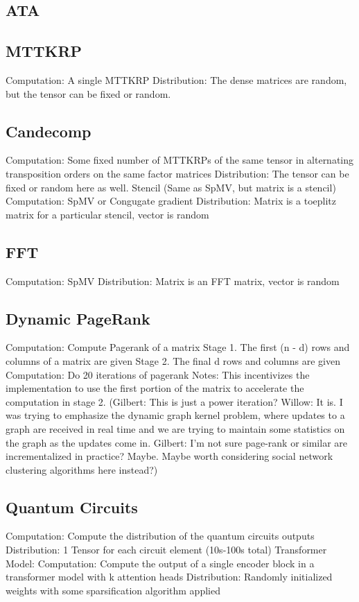 \documentclass{article}
\begin{document}
\subsection{ATA}

\subsection{MTTKRP}
	Computation: A single MTTKRP 
	Distribution: The dense matrices are random, but the tensor can be fixed or random.


\subsection{Candecomp}
	Computation: Some fixed number of MTTKRPs of the same tensor in alternating transposition orders on the same factor matrices
	Distribution: The tensor can be fixed or random here as well.
Stencil (Same as SpMV, but matrix is a stencil)
	Computation: SpMV or Congugate gradient
	Distribution: Matrix is a toeplitz matrix for a particular stencil, vector is random

\subsection{FFT}
	Computation: SpMV
	Distribution: Matrix is an FFT matrix, vector is random

\subsection{Dynamic PageRank}
	Computation: Compute Pagerank of a matrix
	Stage 1.
		The first (n - d) rows and columns of a matrix are given
	Stage 2.
		The final d rows and columns are given
	Computation:
		Do 20 iterations of pagerank
	Notes: This incentivizes the implementation to use the first portion of the matrix to accelerate the computation in stage 2.
(Gilbert: This is just a power iteration? Willow: It is. I was trying to emphasize the dynamic graph kernel problem, where updates to a graph are received in real time and we are trying to maintain some statistics on the graph as the updates come in. Gilbert: I'm not sure page-rank or similar are incrementalized in practice?  Maybe.  Maybe worth considering social network clustering algorithms here instead?)

\subsection{Quantum Circuits}
	Computation: Compute the distribution of the quantum circuits outputs
	Distribution: 1 Tensor for each circuit element (10s-100s total)
Transformer Model:
	Computation: Compute the output of a single encoder block in a transformer model with k attention heads
	Distribution: Randomly initialized weights with some sparsification algorithm applied
 
\end{document}
